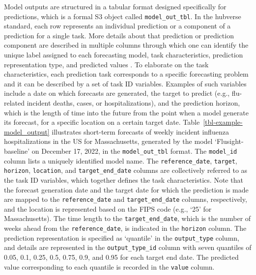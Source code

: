 \documentclass[
  article,
  shortnames,
  notitle]{jss}
\begin{document}
Model outputs are structured in a tabular format designed specifically
for predictions, which is a formal S3 object called
\texttt{model\_out\_tbl}. In the hubverse standard, each row represents
an individual prediction or a component of a prediction for a single
task. More details about that prediction or prediction component are
described in multiple columns through which one can identify the unique
label assigned to each forecasting model, task characteristics,
prediction representation type, and predicted values
\citep{shandross2026multi}. To elaborate on the task characteristics,
each prediction task corresponds to a specific forecasting problem and
it can be described by a set of task ID variables. Examples of such
variables include a date on which forecasts are generated, the target to
predict (e.g., flu-related incident deaths, cases, or hospitalizations),
and the prediction horizon, which is the length of time into the future
from the point when a model generate its forecast, for a specific
location on a certain target date. Table~\ref{tbl-example-model_output}
illustrates short-term forecasts of weekly incident influenza
hospitalizations in the US for Massachusetts, generated by the model
`Flusight-baseline' on December 17, 2022, in the
\texttt{model\_out\_tbl} format. The \texttt{model\_id} column lists a
uniquely identified model name. The \texttt{reference\_date},
\texttt{target}, \texttt{horizon}, \texttt{location}, and
\texttt{target\_end\_date} columns are collectively referred to as the
task ID variables, which together defines the task characteristics. Note
that the forecast generation date and the target date for which the
prediction is made are mapped to the \texttt{reference\_date} and
\texttt{target\_end\_date} columns, respectively, and the location is
represented based on the FIPS code (e.g., `25' for Massachusetts). The
time length to the \texttt{target\_end\_date}, which is the number of
weeks ahead from the \texttt{reference\_date}, is indicated in the
\texttt{horizon} column. The prediction representation is specified as
`quantile' in the \texttt{output\_type} column, and details are
represented in the \texttt{output\_type\_id} column with seven quantiles
of 0.05, 0.1, 0.25, 0.5, 0.75, 0.9, and 0.95 for each target end date.
The predicted value corresponding to each quantile is recorded in the
\texttt{value} column.
\end{document}
